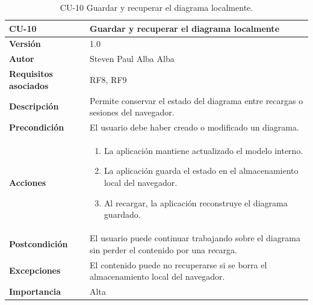 \begin{table}[p]
\centering
\begin{tabularx}{\linewidth}{ p{} p{} }
\toprule
\textbf{CU-10} & \textbf{Guardar y recuperar el diagrama localmente}\\
\toprule
\textbf{Versión} & 1.0 \\
\textbf{Autor} & Steven Paul Alba Alba \\
\textbf{Requisitos asociados} & RF8, RF9 \\
\textbf{Descripción} & Permite conservar el estado del diagrama entre recargas o sesiones del navegador. \\
\textbf{Precondición} & El usuario debe haber creado o modificado un diagrama. \\
\textbf{Acciones} &
\begin{enumerate}
\def\labelenumi{\arabic{enumi}.}
\tightlist
\item La aplicación mantiene actualizado el modelo interno.
\item La aplicación guarda el estado en el almacenamiento local del navegador.
\item Al recargar, la aplicación reconstruye el diagrama guardado.
\end{enumerate}\\
\textbf{Postcondición} & El usuario puede continuar trabajando sobre el diagrama sin perder el contenido por una recarga. \\
\textbf{Excepciones} & El contenido puede no recuperarse si se borra el almacenamiento local del navegador. \\
\textbf{Importancia} & Alta \\
\bottomrule
\end{tabularx}
\caption{CU-10 Guardar y recuperar el diagrama localmente.}
\end{table}

